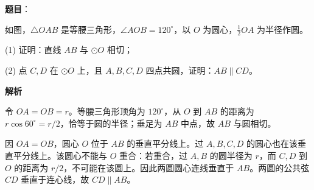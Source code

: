 \begin{answer}

\textbf{题目}：

如图，$\triangle OAB$ 是等腰三角形，$\angle AOB=120^\circ$，以 $O$ 为圆心，$\frac12 OA$ 为半径作圆。
\nopagebreak[4]
\begin{center}\end{center}
\nopagebreak[4]
   (1) 证明：直线 $AB$ 与 $\odot O$ 相切；

   (2) 点 $C,D$ 在 $\odot O$ 上，且 $A,B,C,D$ 四点共圆，证明：$AB\parallel CD$。

\textbf{解析}


令 \(OA=OB=r\)。等腰三角形顶角为 \(120^\circ\)，从 \(O\) 到 \(AB\) 的距离为 \(r\cos60^\circ=r/2\)，恰等于圆的半径；垂足为 \(AB\) 中点，故 \(AB\) 与圆相切。


因 \(OA=OB\)，圆心 \(O\) 位于 \(AB\) 的垂直平分线上。过 \(A,B,C,D\) 的圆心也在该垂直平分线上。该圆心不能与 \(O\) 重合：若重合，过 \(A,B\) 的圆半径为 \(r\)，而 \(C,D\) 到 \(O\) 的距离为 \(r/2\)，不可能在该圆上。因此两圆圆心连线垂直于 \(AB\)。两圆的公共弦 \(CD\) 垂直于连心线，故 \(CD\parallel AB\)。



\end{answer}
